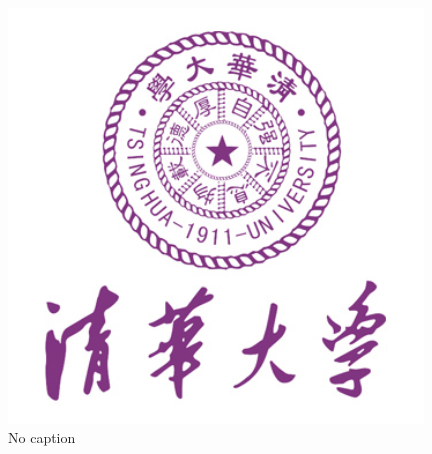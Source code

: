 \begin{figure}[htbp]
\centering
\includegraphics[width=11cm]{resources/logo.jpg}
\caption{No caption}
\label{fig:fullarm}
\end{figure}





